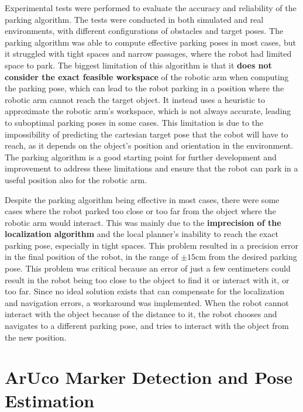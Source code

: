 Experimental tests were performed to evaluate the accuracy and reliability of the parking algorithm.
The tests were conducted in both simulated and real environments, with different configurations of obstacles
and target poses. The parking algorithm was able to compute effective parking poses in most cases,
but it struggled with tight spaces and narrow passages, where the robot had limited space to park.
The biggest limitation of this algorithm is that it \textbf{does not consider the exact feasible workspace} of the robotic arm
when computing the parking pose, which can lead to the robot parking in a position where the robotic arm
cannot reach the target object. It instead uses a heuristic to approximate the robotic arm's workspace,
which is not always accurate, leading to suboptimal parking poses in some cases.
This limitation is due to the impossibility of predicting the cartesian
target pose that the cobot will have to reach, as it depends on the object's position and orientation
in the environment. The parking algorithm is a good starting point for further development and improvement
to address these limitations and ensure that the robot can park in a useful position also for the robotic arm.

Despite the parking algorithm being effective in most cases, there were some cases where the robot parked too close
or too far from the object where the robotic arm would interact. This was mainly due to the
\textbf{imprecision of the localization algorithm} and the local planner's inability to reach the exact parking pose,
especially in tight spaces. This problem resulted in a precision error 
in the final position of the robot, in the range of $\pm 15$cm from the desired parking pose. This problem was
critical because an error of just a few centimeters could result in the robot being too close to the object
to find it or interact with it, or too far. Since no ideal solution exists that
can compensate for the localization and navigation errors, a workaround was implemented. When the robot cannot interact 
with the object because of the distance to it, the robot chooses and navigates to a different parking pose,
and tries to interact with the object from the new position. 

\section{ArUco Marker Detection and Pose Estimation}

